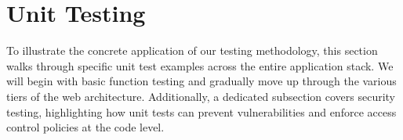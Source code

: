 \section{Unit Testing}
To illustrate the concrete application of our testing methodology, this section walks through specific unit test examples across the entire application stack. We will begin with basic function testing and gradually move up through the various tiers of the web architecture. Additionally, a dedicated subsection covers security testing, highlighting how unit tests can prevent vulnerabilities and enforce access control policies at the code level.






